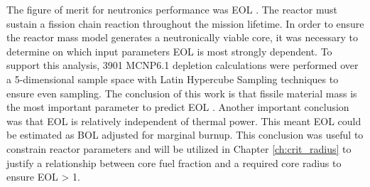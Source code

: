The figure of merit for neutronics performance was EOL \keff. The reactor must
sustain a fission chain reaction throughout the mission lifetime. In order to
ensure the reactor mass model generates a neutronically viable core, it was
necessary to determine on which input parameters EOL \keff is most strongly
dependent. To support this analysis, 3901 MCNP6.1 depletion calculations were
performed over a 5-dimensional sample space with Latin Hypercube Sampling
techniques to ensure even sampling. The conclusion of this work is that fissile
material mass is the most important parameter to predict EOL \keff. Another
important conclusion was that EOL \keff is relatively independent of thermal power. This
meant EOL \keff could be estimated as BOL \keff adjusted for marginal burnup.
This conclusion was useful to constrain reactor parameters and will be utilized
in Chapter \ref{ch:crit_radius} to justify a relationship between core fuel fraction
and a required core radius to ensure EOL \keff > 1.
